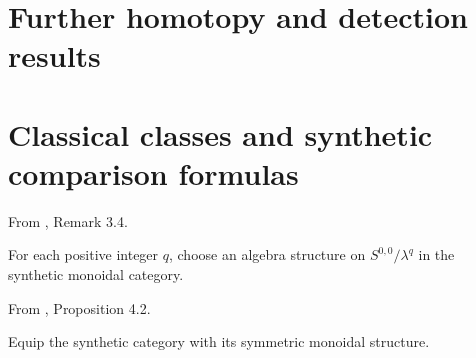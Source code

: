 \section{Further homotopy and detection results}
\section{Classical classes and synthetic comparison formulas}
\begin{definition}
\label{frontier:Literature:63eb956dffc1}
From \cite{LWX126}, Remark 3.4.\par

For each positive integer $q$, choose an algebra structure on $S^{0,0}/\lambda^q$ in the synthetic monoidal category.
\end{definition}

\begin{definition}
\label{frontier:Literature:73db85fe3f01}
From \cite{Pst}, Proposition 4.2.\par

Equip the synthetic category with its symmetric monoidal structure.
\end{definition}

